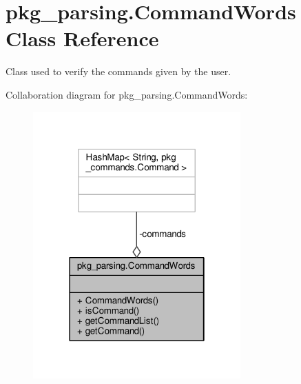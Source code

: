 \hypertarget{classpkg__parsing_1_1CommandWords}{\section{pkg\-\_\-parsing.\-Command\-Words Class Reference}
\label{classpkg__parsing_1_1CommandWords}
}


Class used to verify the commands given by the user.  




Collaboration diagram for pkg\-\_\-parsing.\-Command\-Words\-:
\nopagebreak
\begin{figure}[H]
\begin{center}
\leavevmode
\includegraphics[width=226pt]{classpkg__parsing_1_1CommandWords__coll__graph}
\end{center}
\end{figure}
